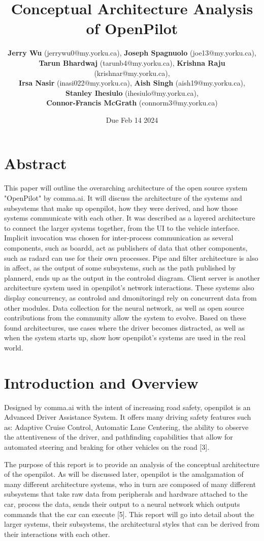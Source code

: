 \documentclass[12pt]{article}
\title{Conceptual Architecture Analysis of OpenPilot}
\author{
    \textbf{Jerry Wu} (jerrywu0@my.yorku.ca), \textbf{Joseph Spagnuolo} (joe13@my.yorku.ca),\\ \textbf{Tarun Bhardwaj} (tarunb4@my.yorku.ca),
    \textbf{Krishna Raju} (krishnar@my.yorku.ca),\\ \textbf{Irsa Nasir} (inasi022@my.yorku.ca),
    \textbf{Aish Singh} (aish19@my.yorku.ca),\\ \textbf{Stanley Ihesiulo} (ihesiulo@my.yorku.ca),\\
    \textbf{Connor-Francis McGrath} (connorm3@my.yorku.ca)
}
\date{Due Feb 14 2024}
\begin{document}
\maketitle
\tableofcontents


\newpage


\section{Abstract}
This paper will outline the overarching architecture of the open source system "OpenPilot" by comma.ai. It will discuss the architecture of the systems and subsystems that make up openpilot, how they were derived, and how those systems communicate with each other. It was described as a layered architecture to connect the larger systems together, from the UI to the vehicle interface. Implicit invocation was chosen for inter-process communication as several components, such as boardd, act as publishers of data that other components, such as radard can use for their own processes. Pipe and filter architecture is also in affect, as the output of some subsystems, such as the path published by plannerd, ends up as the output in the controlsd diagram. Client server is another architecture system used in openpilot's network interactions. These systems also display concurrency, as controlsd and dmonitoringd rely on concurrent data from other modules. Data collection for the neural network, as well as open source contributions from the community allow the system to evolve. Based on these found architectures, use cases where the driver becomes distracted, as well as when the system starts up, show how openpilot's systems are used in the real world.



\section{Introduction and Overview}
Designed by comma.ai with the intent of increasing road safety, openpilot is an Advanced Driver Assistance System. It offers many driving safety features such as: Adaptive Cruise Control, Automatic Lane Centering, the ability to observe the attentiveness of the driver, and pathfinding capabilities that allow for automated steering and braking for other vehicles on the road [3].

The purpose of this report is to provide an analysis of the conceptual architecture of the openpilot. As will be discussed later, openpilot is the amalgamation of many different architecture systems, who in turn are composed of many different subsystems that take raw data from peripherals and hardware attached to the car, process the data, sends their output to a neural network which outputs commands that the car can execute [5]. This report will go into detail about the larger systems, their subsystems, the architectural styles that can be derived from their interactions with each other.
\end{document}
